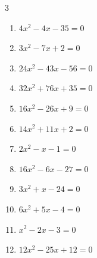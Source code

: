 \begin{multicols}{3}
\begin{enumerate}

\columnbreak %

\resetques

  \item $4x^{2}-4x-35=0$


  \item $3x^{2}-7x+2=0$


  \item $24x^{2}-43x-56=0$


  \item $32x^{2}+76x+35=0$


  \item $16x^{2}-26x+9=0$


  \item $14x^{2}+11x+2=0$


  \item $2x^{2}-x-1=0$


  \item $16x^{2}-6x-27=0$


  \item $3x^{2}+x-24=0$


  \item $6x^{2}+5x-4=0$


\columnbreak %

  \item $x^{2}-2x-3=0$

        \phantom{$\displaystyle x=-1,\; 3$}

  \item $12x^{2}-25x+12=0$


\end{enumerate}
\end{multicols}
